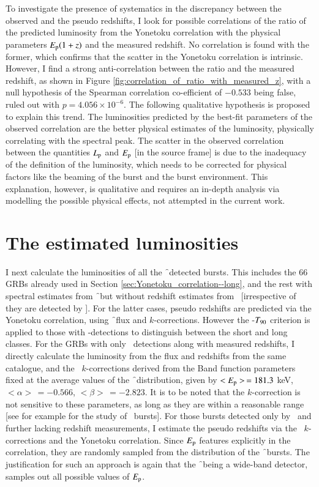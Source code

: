To investigate the presence of systematics in the discrepancy between the observed and the pseudo redshifts, I look for possible correlations of the ratio of the predicted luminosity from the Yonetoku correlation with the physical parameters $E_{\rm p} (1+z)$ and the measured redshift. No correlation is found with the former, which confirms that the scatter in the Yonetoku correlation is intrinsic. However, I find a strong anti-correlation between the ratio and the measured redshift, as shown in Figure \ref{fig:correlation_of_ratio_with_measured_z}, with a null hypothesis of the Spearman correlation co-efficient of $-0.533$ being false, ruled out with $p = 4.056 \times 10^{-6}$. The following qualitative hypothesis is proposed to explain this trend. The luminosities predicted by the best-fit parameters of the observed correlation are the better physical estimates of the luminosity, physically correlating with the spectral peak. The scatter in the observed correlation between the quantities $L_{\rm p}$ and $E_{\rm p}$ [in the source frame] is due to the inadequacy of the definition of the luminosity, which needs to be corrected for physical factors like the beaming of the burst and the burst environment. This explanation, however, is qualitative and requires an in-depth analysis via modelling the possible physical effects, not attempted in the current work.


\section{The estimated luminosities}
\label{sec:The_estimated_luminosities--long}

I next calculate the luminosities of all the \f\ detected bursts. This includes the $66$ GRBs already used in Section \ref{sec:Yonetoku_correlation--long}, and the rest with spectral estimates from \f\ but without redshift estimates from \s\ [irrespective of they are detected by \s]. For the latter cases, pseudo redshifts are predicted via the Yonetoku correlation, using \f\ flux and $k$-corrections. However the \s-$T_{\rm{90}}$ criterion is applied to those with \s-detections to distinguish between the short and long classes. For the GRBs with only \s\ detections along with measured redshifts, I directly calculate the luminosity from the flux and redshifts from the same catalogue, and the \s\ $k$-corrections derived from the Band function parameters fixed at the average values of the \f\ distribution, given by $<E_{\rm p}> \, =181.3$ keV, $<\alpha> \, = -0.566$, $<\beta> \, = -2.823$. It is to be noted that the $k$-correction is not sensitive to these parameters, as long as they are within a reasonable range [see for example \cite{Preece_et_al.-2000-ApJS} for the study of \B\ bursts]. For those bursts detected only by \s\ and further lacking redshift measurements, I estimate the pseudo redshifts via the \s\ $k$-corrections and the Yonetoku correlation. Since $E_{\rm p}$ features explicitly in the correlation, they are randomly sampled from the distribution of the \f\ bursts. The justification for such an approach is again that the \f\ being a wide-band detector, samples out all possible values of $E_{\rm p}$.


